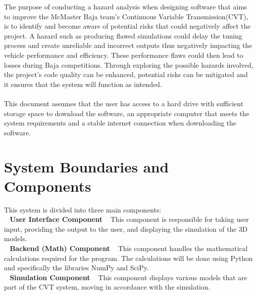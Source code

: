 \documentclass{article}
\begin{document}
The purpose of conducting a hazard analysis when designing software that aims to improve the
McMaster Baja team's Continuous Variable Transmission(CVT), is to identify and become aware of potential risks that could negatively affect the project. 
A hazard such as producing flawed simulations could delay the tuning process and create unreliable and incorrect outputs thus negatively impacting the vehicle performance and efficiency. 
These performance flaws could then lead to losses during Baja competitions. 
Through exploring the possible hazards involved, the project's code quality can be enhanced, potential risks can be mitigated and it ensures that the system will function as intended. 
\\\\
\noindent This document assumes that the user has access to a hard drive with sufficient storage space to download the software, an appropriate computer that meets the system requirements and a stable internet connection when downloading the software. 

\section{System Boundaries and Components}

This system is divided into three main components:\\
~\newline
\textbf{User Interface Component}  
~\newline
This component is responsible for taking user input, providing the output to the user, and displaying the simulation of the 3D models.\\
~\newline
\textbf{Backend (Math) Component}  
~\newline
This component handles the mathematical calculations required for the program. The calculations will be done using Python and specifically the libraries NumPy and SciPy.\\
~\newline
\textbf{Simulation Component}  
~\newline
This component displays various models that are part of the CVT system, moving in accordance with the simulation.\\

\end{document}
